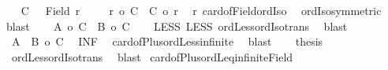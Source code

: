 \begin{isabellebody}
%
\endisadelimproof
%
\isatagproof
{}\isamarkupfalse%
{\isacharminus}{\kern0pt}\isanewline
\ \ \isamarkupfalse%
\ {\isacharquery}{\kern0pt}C\ \ {\isacharequal}{\kern0pt}\ {\isachardoublequoteopen}Field\ r{\isachardoublequoteclose}\isanewline
\ \ \isamarkupfalse%
\ {}{\isacharcolon}{\kern0pt}\ {\isachardoublequoteopen}r\ {\isacharequal}{\kern0pt}o\ {\isacharbar}{\kern0pt}{\isacharquery}{\kern0pt}C{\isacharbar}{\kern0pt}\ {\isasymand}\ {\isacharbar}{\kern0pt}{\isacharquery}{\kern0pt}C{\isacharbar}{\kern0pt}\ {\isacharequal}{\kern0pt}o\ r{\isachardoublequoteclose}\ \isamarkupfalse%
\ r\ card{\isacharunderscore}{\kern0pt}of{\isacharunderscore}{\kern0pt}Field{\isacharunderscore}{\kern0pt}ordIso\isanewline
\ \ ordIso{\isacharunderscore}{\kern0pt}symmetric\ \isamarkupfalse%
\ blast\isanewline
\ \ \isamarkupfalse%
\ {\isachardoublequoteopen}{\isacharbar}{\kern0pt}A{\isacharbar}{\kern0pt}\ {\isacharless}{\kern0pt}o\ {\isacharbar}{\kern0pt}{\isacharquery}{\kern0pt}C{\isacharbar}{\kern0pt}{\isachardoublequoteclose}\ \ {\isachardoublequoteopen}{\isacharbar}{\kern0pt}B{\isacharbar}{\kern0pt}\ {\isacharless}{\kern0pt}o\ {\isacharbar}{\kern0pt}{\isacharquery}{\kern0pt}C{\isacharbar}{\kern0pt}{\isachardoublequoteclose}\isanewline
\ \ \isamarkupfalse%
\ LESS{}\ LESS{}\ ordLess{\isacharunderscore}{\kern0pt}ordIso{\isacharunderscore}{\kern0pt}trans\ \isamarkupfalse%
\ blast{\isacharplus}{\kern0pt}\isanewline
\ \ \isamarkupfalse%
\ \ {\isachardoublequoteopen}{\isacharbar}{\kern0pt}A\ {\isacharless}{\kern0pt}{\isacharplus}{\kern0pt}{\isachargreater}{\kern0pt}\ B{\isacharbar}{\kern0pt}\ {\isacharless}{\kern0pt}o\ {\isacharbar}{\kern0pt}{\isacharquery}{\kern0pt}C{\isacharbar}{\kern0pt}{\isachardoublequoteclose}\ \isamarkupfalse%
\ INF\isanewline
\ \ card{\isacharunderscore}{\kern0pt}of{\isacharunderscore}{\kern0pt}Plus{\isacharunderscore}{\kern0pt}ordLess{\isacharunderscore}{\kern0pt}infinite\ \isamarkupfalse%
\ blast\isanewline
\ \ \isamarkupfalse%
\ {\isacharquery}{\kern0pt}thesis\ \isamarkupfalse%
\ {}\ ordLess{\isacharunderscore}{\kern0pt}ordIso{\isacharunderscore}{\kern0pt}trans\ \isamarkupfalse%
\ blast\isanewline
{}\isamarkupfalse%
%
\endisatagproof
{\isafoldproof}%
%
\isadelimproof
\isanewline
%
\endisadelimproof
\isanewline
{}\isamarkupfalse%
\ card{\isacharunderscore}{\kern0pt}of{\isacharunderscore}{\kern0pt}Plus{\isacharunderscore}{\kern0pt}ordLeq{\isacharunderscore}{\kern0pt}infinite{\isacharunderscore}{\kern0pt}Field{\isacharcolon}{\kern0pt}\isanewline

\end{isabellebody}
